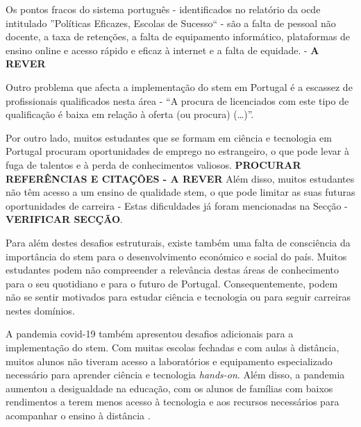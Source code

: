 
Os pontos fracos do sistema português - identificados no relatório da \acrshort{ocde} intitulado ''Políticas Eficazes, Escolas de Sucesso`` - são a falta de pessoal não docente, a taxa de retenções, a falta de equipamento informático, plataformas de ensino online e acesso rápido e eficaz à internet e a falta de equidade. - \textbf{A REVER}

Outro problema que afecta a implementação do \acrshort{stem} em Portugal é a escassez de profissionais qualificados nesta área \cite{Qualific91:online} - ``A procura de licenciados com este tipo de qualificação é baixa em relação à oferta (ou procura) (\ldots)''.

Por outro lado, muitos estudantes que se formam em ciência e tecnologia em Portugal procuram oportunidades de emprego no estrangeiro, o que pode levar à fuga de talentos e à perda de conhecimentos valiosos. \textbf{PROCURAR REFERÊNCIAS E CITAÇÕES - A REVER} Além disso, muitos estudantes não têm acesso a um ensino de qualidade \acrshort{stem}, o que pode limitar as suas futuras oportunidades de carreira - Estas dificuldades já foram mencionadas na Secção - \textbf{VERIFICAR SECÇÃO}.

Para além destes desafios estruturais, existe também uma falta de consciência da importância do \acrshort{stem} para o desenvolvimento económico e social do país. Muitos estudantes podem não compreender a relevância destas áreas de conhecimento para o seu quotidiano e para o futuro de Portugal. Consequentemente, podem não se sentir motivados para estudar ciência e tecnologia ou para seguir carreiras nestes domínios.

A pandemia \acrshort{covid-19} também apresentou desafios adicionais para a implementação do \acrshort{stem}. Com muitas escolas fechadas e com aulas à distância, muitos alunos não tiveram acesso a laboratórios e equipamento especializado necessário para aprender ciência e tecnologia \textit{hands-on}. Além disso, a pandemia aumentou a desigualdade na educação, com os alunos de famílias com baixos rendimentos a terem menos acesso à tecnologia e aos recursos necessários para acompanhar o ensino à distância \cite{desigualdadespandemia}\cite{efeitospandemiadigital}.

